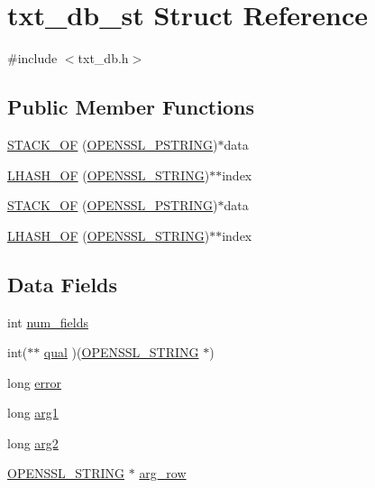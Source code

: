\hypertarget{structtxt__db__st}{}\section{txt\+\_\+db\+\_\+st Struct Reference}
\label{structtxt__db__st}


{\ttfamily \#include $<$txt\+\_\+db.\+h$>$}

\subsection*{Public Member Functions}
\begin{DoxyCompactItemize}
\item 
\hyperlink{structtxt__db__st_aca1b60c377778336b5db112d797a53b8}{S\+T\+A\+C\+K\+\_\+\+OF} (\hyperlink{crypto_2txt__db_2txt__db_8h_a6a35660313db49640015c0c4fc06676a}{O\+P\+E\+N\+S\+S\+L\+\_\+\+P\+S\+T\+R\+I\+NG})$\ast$data
\item 
\hyperlink{structtxt__db__st_a57d33d400c7843e13c29f55892430cda}{L\+H\+A\+S\+H\+\_\+\+OF} (\hyperlink{crypto_2stack_2safestack_8h_a0c7cad03962a61035f753d64e05503e3}{O\+P\+E\+N\+S\+S\+L\+\_\+\+S\+T\+R\+I\+NG})$\ast$$\ast$index
\item 
\hyperlink{structtxt__db__st_aca1b60c377778336b5db112d797a53b8}{S\+T\+A\+C\+K\+\_\+\+OF} (\hyperlink{crypto_2txt__db_2txt__db_8h_a6a35660313db49640015c0c4fc06676a}{O\+P\+E\+N\+S\+S\+L\+\_\+\+P\+S\+T\+R\+I\+NG})$\ast$data
\item 
\hyperlink{structtxt__db__st_a57d33d400c7843e13c29f55892430cda}{L\+H\+A\+S\+H\+\_\+\+OF} (\hyperlink{crypto_2stack_2safestack_8h_a0c7cad03962a61035f753d64e05503e3}{O\+P\+E\+N\+S\+S\+L\+\_\+\+S\+T\+R\+I\+NG})$\ast$$\ast$index
\end{DoxyCompactItemize}
\subsection*{Data Fields}
\begin{DoxyCompactItemize}
\item 
int \hyperlink{structtxt__db__st_ac0ae3334b9e17a8fd23ad6fd3a032034}{num\+\_\+fields}
\item 
int($\ast$$\ast$ \hyperlink{structtxt__db__st_ade931ec8bf7b514a879a8c90db043e81}{qual} )(\hyperlink{crypto_2stack_2safestack_8h_a0c7cad03962a61035f753d64e05503e3}{O\+P\+E\+N\+S\+S\+L\+\_\+\+S\+T\+R\+I\+NG} $\ast$)
\item 
long \hyperlink{structtxt__db__st_a0034dae14c0236405964d5d0ca247c6b}{error}
\item 
long \hyperlink{structtxt__db__st_a83b4aa0ac2049142d89199a5bb676b5e}{arg1}
\item 
long \hyperlink{structtxt__db__st_a84553ad5f6fe0e4c3294893a27162ea3}{arg2}
\item 
\hyperlink{crypto_2stack_2safestack_8h_a0c7cad03962a61035f753d64e05503e3}{O\+P\+E\+N\+S\+S\+L\+\_\+\+S\+T\+R\+I\+NG} $\ast$ \hyperlink{structtxt__db__st_aa903822f206b9936e503daa6f636749d}{arg\+\_\+row}
\end{DoxyCompactItemize}



